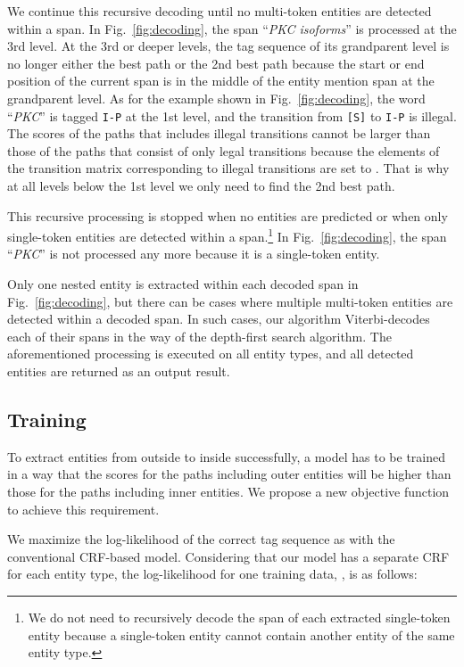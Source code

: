 \documentclass[11pt,a4paper]{article}
\def\figref#1{Fig.~\ref{#1}}
\begin{document}
We continue this recursive decoding until no multi-token entities are detected within a span.
In \figref{fig:decoding}, the span ``{\it PKC isoforms}'' is processed at the 3rd level.
At the 3rd or deeper levels, the tag sequence of its grandparent level is no longer either the best path or the 2nd best path because the start or end position of the current span is in the middle of the entity mention span at the grandparent level.
As for the example shown in \figref{fig:decoding}, the word ``{\it PKC}'' is tagged {\tt I-P} at the 1st level, and the transition from {\tt [S]} to {\tt I-P} is illegal.
The scores of the paths that includes illegal transitions cannot be larger than those of the paths that consist of only legal transitions because the elements of the transition matrix  corresponding to illegal transitions are set to .
That is why at all levels below the 1st level we only need to find the 2nd best path.

This recursive processing is stopped when no entities are predicted or when only single-token entities are detected within a span.\footnote{We do not need to recursively decode the span of each extracted single-token entity because a single-token entity cannot contain another entity of the same entity type.}
In \figref{fig:decoding}, the span ``{\it PKC}'' is not processed any more because it is a single-token entity.

Only one nested entity is extracted within each decoded span in \figref{fig:decoding}, but there can be cases where multiple multi-token entities are detected within a decoded span.
In such cases, our algorithm Viterbi-decodes each of their spans in the way of the depth-first search algorithm.
The aforementioned processing is executed on all entity types, and all detected entities are returned as an output result.

\subsection{Training}

To extract entities from outside to inside successfully, a model has to be trained in a way that the scores for the paths including outer entities will be higher than those for the paths including inner entities.
We propose a new objective function to achieve this requirement.

We maximize the log-likelihood of the correct tag sequence as with the conventional CRF-based model.
Considering that our model has a separate CRF for each entity type, the log-likelihood for one training data, , is as follows:
\end{document}
